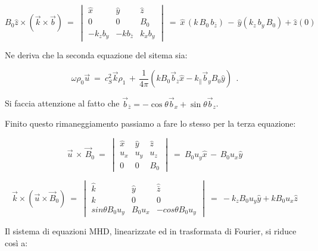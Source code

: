 \[  B_0\hat z\times (\vec k\times \vec b) \ =\ \begin{vmatrix} 
	\hat x & \hat y & \hat z \\ 
	0 & 0 & B_0\\
	-k_{z} b_y & - k b_{\bar z} & k_{x} b_y
\end{vmatrix} \ =\ \hat x\,(k\,B_0\, b_{\bar z})\, -\, \hat y (k_{z}\, b_y\, B_0) + \hat z(0)\]

Ne deriva che la seconda equazione del sitema sia:  

\[\omega \rho_0\vec u\ =\ c^2_S \vec k \rho_1\, +\, \frac{1}{4\pi}(kB_0 \vec b_{\bar z} \hat x - k_\parallel \vec b_y B_0 \hat y)\ \ .\] 

Si faccia attenzione al fatto che $\vec b_{\bar z} = -\cos\theta \vec b_x + \sin\theta \vec b_z$.

Finito questo rimaneggiamento passiamo a fare lo stesso per la terza equazione:

\[ \vec u\,\times\,\vec B_0\ =\ \begin{vmatrix} 
	\hat x & \hat y & \hat{z} \\ 
	u_x & u_y & u_{z}\\
	0 & 0 & B_0
\end{vmatrix} \ =\ B_0 u_y \hat x\, -\,  B_0 u_x \hat{y} \]

\[ \vec k\times (\vec u\times \vec B_0) \ =\ \begin{vmatrix} 
	\hat k & \hat y & \hat{\bar z} \\ 
	k & 0 & 0\\
	sin\theta B_0 u_y & B_0 u_x & -cos\theta B_0 u_y
\end{vmatrix} \ =\ -k_z B_0 u_y \hat y + k B_0 u_x \hat z\]

Il sistema di equazioni MHD, linearizzate ed in trasformata di Fourier, si riduce così a:


